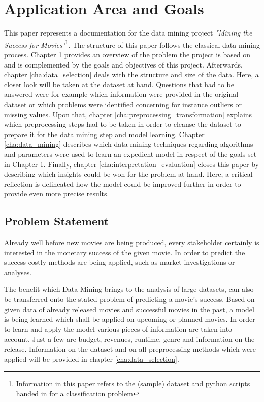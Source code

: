 \chapter{Application Area and Goals}
\label{cha:area_goals}
This paper represents a documentation for the data mining project \textit{"Mining the Success for Movies"}\footnote{ Information in this paper refers to the (sample) dataset and python scripts handed in for a classification problem}. The structure of this paper follows the classical data mining process. Chapter \ref{cha:area_goals} provides an overview of the problem the project is based on and is complemented by the goals and objectives of this project. Afterwards, chapter \ref{cha:data_selection} deals with the structure and size of the data. Here, a closer look will be taken at the dataset at hand. Questions that had to be answered were for example which information were provided in the original dataset or which problems were identified concerning for instance outliers or missing values. Upon that, chapter \ref{cha:preprocessing_transformation} explains which preprocessing steps had to be taken in order to cleanse the dataset to prepare it for the data mining step and model learning. Chapter \ref{cha:data_mining} describes which data mining techniques regarding algorithms and parameters were used to learn an expedient model in respect of the goals set in Chapter \ref{cha:area_goals}. Finally, chapter \ref{cha:interpretation_evaluation} closes this paper by describing which insights could be won for the problem at hand. Here, a critical reflection is delineated how the model could be improved further in order to provide even more precise results.

\section{Problem Statement}
Already well before new movies are being produced, every stakeholder certainly is interested in the monetary success of the given movie. In order to predict the success costly methods are being applied, such as market investigations or analyses.

The benefit which Data Mining brings to the analysis of large datasets, can also be transferred onto the stated problem of predicting a movie's success. Based on given data of already released movies and successful movies in the past, a model is being learned which shall be applied on upcoming or planned movies. In order to learn and apply the model various pieces of information are taken into account. Just a few are budget, revenues, runtime, genre and information on the release. Information on the dataset and on all preprocessing methods which were applied will be provided in chapter \ref{cha:data_selection}.


